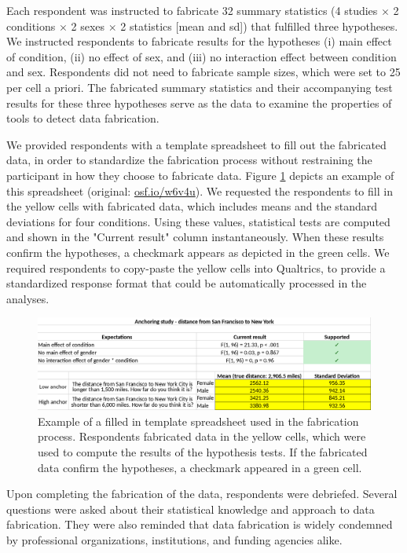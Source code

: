 \documentclass{article}
\begin{document}
Each respondent was instructed to fabricate 32 summary statistics (4 studies $\times$ 2 conditions $\times$ 2 sexes $\times$ 2 statistics [mean and sd]) that fulfilled three hypotheses. We instructed respondents to fabricate results for the hypotheses (i) main effect of condition, (ii) no effect of sex, and (iii) no interaction effect between condition and sex. Respondents did not need to fabricate sample sizes, which were set to 25 per cell a priori. The fabricated summary statistics and their accompanying test results for these three hypotheses serve as the data to examine the properties of tools to detect data fabrication.

We provided respondents with a template spreadsheet to fill out the fabricated data, in order to standardize the fabrication process without restraining the participant in how they choose to fabricate data. Figure \ref{fig1} depicts an example of this spreadsheet (original:  \url{osf.io/w6v4u}). We requested the respondents to fill in the yellow cells with fabricated data, which includes means and the standard deviations for four conditions. Using these values, statistical tests are computed and shown in the "Current result" column instantaneously. When these results confirm the hypotheses, a checkmark appears as depicted in the green cells. We required respondents to copy-paste the yellow cells into Qualtrics, to provide a standardized response format that could be automatically processed in the analyses.

\begin{figure}
\begin{center}
\includegraphics[width=\textwidth,height=\textheight,keepaspectratio]{../figures/spreadsheet.png}
\caption{Example of a filled in template spreadsheet used in the fabrication process. Respondents fabricated data in the yellow cells, which were used to compute the results of the hypothesis tests. If the fabricated data confirm the hypotheses, a checkmark appeared in a green cell.}
\label{fig1}
\end{center}
\end{figure}

Upon completing the fabrication of the data, respondents were debriefed. Several questions were asked about their statistical knowledge and approach to data fabrication. They were also reminded that data fabrication is widely condemned by professional organizations, institutions, and funding agencies alike.
\end{document}
